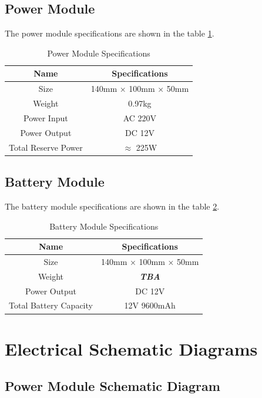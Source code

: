 \documentclass{article}
\begin{document}
\subsection{Power Module}
The power module specifications are shown in the table \ref{tab:power-specs}.
\begin{table}[htbp]
    \centering
    \caption{Power Module Specifications}
    \label{tab:power-specs}
    \begin{tabular}{|c|c|}
        \hline
        \toprule
        Name & Specifications \\
        \midrule
        Size & 140mm × 100mm × 50mm\\
        \hline
        Weight & 0.97kg\\
        \hline
        Power Input & AC 220V\\
        \hline
        Power Output & DC 12V\\
        \hline
        Total Reserve Power& $\approx$ 225W\\
        \hline
        \bottomrule
    \end{tabular}
\end{table}

\subsection{Battery Module}
The battery module specifications are shown in the table \ref{tab:battery-specs}.
\begin{table}[htbp]
    \centering
    \caption{Battery Module Specifications}
    \label{tab:battery-specs}
    \begin{tabular}{|c|c|}
        \hline
        \toprule
        Name & Specifications \\
        \midrule
        Size & 140mm × 100mm × 50mm\\
        \hline
        Weight & {\bfseries\emph{TBA}}\\
        \hline
        Power Output & DC 12V\\
        \hline
        Total Battery Capacity & 12V 9600mAh\\
        \hline
        \bottomrule
    \end{tabular}
\end{table}
\clearpage
\section{Electrical Schematic Diagrams}
\subsection{Power Module Schematic Diagram}

\end{document}
